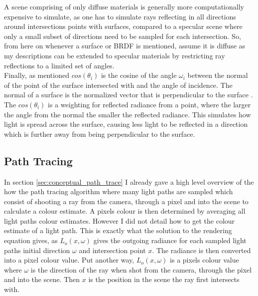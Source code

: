 \documentclass[ %
                    author={Callum Pearce},
                supervisor={Dr. Neill Campbell},
                    degree={MEng},
                     title={How effective are Temporal difference learning methods for reducing the number of zero contribution light paths while still accurately approximating Global Illumination in Path tracing?},
                  subtitle={},
                      type={research},
                      year={2019} ]{dissertation}
\begin{document}
A scene comprising of only diffuse materials is generally more computationally expensive to simulate, as one has to simulate rays reflecting in all directions around intersections points with surfaces, compared to a specular scene where only a small subset of directions need to be sampled for each intersection. So, from here on whenever a surface or BRDF is mentioned, assume it is diffuse as my descriptions can be extended to specular materials by restricting ray reflections to a limited set of angles.\\

Finally, as mentioned $cos(\theta_i)$ is the cosine of the angle $\omega_i$ between the normal of the point of the surface intersected with and the angle of incidence. The normal of a surface is the normalized vector that is perpendicular to the surface \cite{normals}. The $cos(\theta_i)$ is a weighting for reflected radiance from a point, where the larger the angle from the normal the smaller the reflected radiance. This simulates how light is spread across the surface, causing less light to be reflected in a direction which is further away from being perpendicular to the surface.

\subsection{Path Tracing}

In section \ref{sec:conceptual_path_trace} I already gave a high level overview of the how the path tracing algorithm where many light paths are sampled which consist of shooting a ray from the camera, through a pixel and into the scene to calculate a colour estimate. A pixels colour is then determined by averaging all light paths colour estimates. However I did not detail how to get the colour estimate of a light path. This is exactly what the solution to the rendering equation gives, as $L_o(x,\omega)$ gives the outgoing radiance for each sampled light paths initial direction $\omega$ and intersection point $x$. The radiance is then converted into a pixel colour value. Put another way, $L_o(x,\omega)$ is a pixels colour value where $\omega$ is the direction of the ray when shot from the camera, through the pixel and into the scene. Then $x$ is the position in the scene the ray first intersects with. \\

\end{document}
